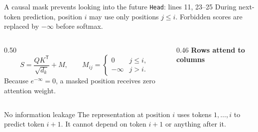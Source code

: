 \begin{frame}{A causal mask prevents looking into the future
  \hfill{\tiny \texttt{Head}: lines 11, 23--25}}
  \small
  During next-token prediction, position $i$ may use only positions
  $j\le i$. Forbidden scores are replaced by $-\infty$ before softmax.

  \begin{columns}[c]
    \begin{column}{0.50\textwidth}
      \[
        S=\frac{QK^{\mathsf T}}{\sqrt{d_k}}+M,
        \qquad
        M_{ij}=\begin{cases}
          0 & j\le i,\\
          -\infty & j>i.
        \end{cases}
      \]
      Because $e^{-\infty}=0$, a masked position receives zero attention
      weight.
    \end{column}
    \begin{column}{0.46\textwidth}
      \centering
      \textbf{Rows attend to columns}

      \vspace{0.4em}
    \end{column}
  \end{columns}

  \begin{alertblock}{No information leakage}
    The representation at position $i$ uses tokens $1,\ldots,i$ to predict
    token $i+1$. It cannot depend on token $i+1$ or anything after it.
  \end{alertblock}
\end{frame}

